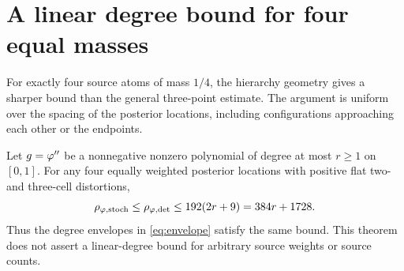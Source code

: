 \section{A linear degree bound for four equal masses}
\label{sec:linearupper}
For exactly four source atoms of mass $1/4$, the hierarchy geometry gives a sharper bound than the general three-point estimate. The argument is uniform over the spacing of the posterior locations, including configurations approaching each other or the endpoints.

\begin{theorem}
\label{thm:linearupper}
Let $g=\varphi''$ be a nonnegative nonzero polynomial of degree at most $r\ge1$ on $[0,1]$. For any four equally weighted posterior locations with positive flat two- and three-cell distortions,
\begin{equation}
\rho_{\varphi,\mathrm{stoch}}\le\rho_{\varphi,\mathrm{det}}\le192(2r+9)=384r+1728.
\label{eq:linearupper}
\end{equation}
Thus the degree envelopes in \eqref{eq:envelope} satisfy the same bound. This theorem does not assert a linear-degree bound for arbitrary source weights or source counts.
\end{theorem}

